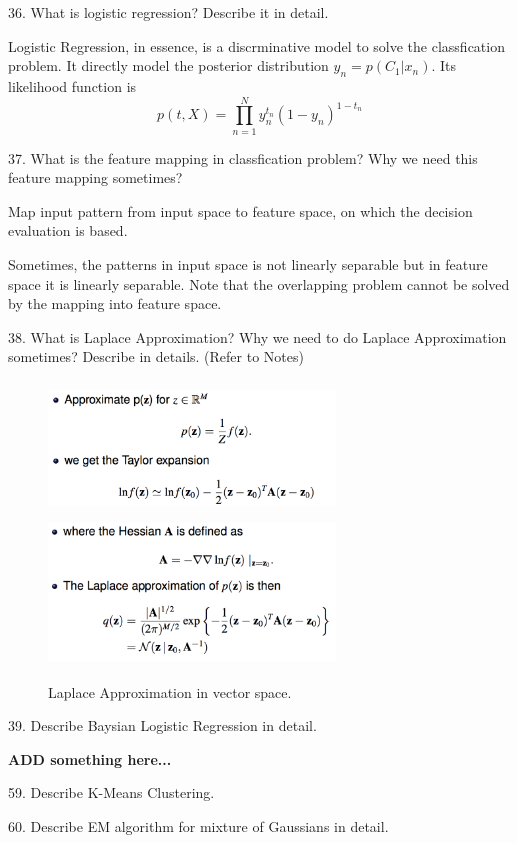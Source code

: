 \documentclass[11pt,a4paper]{article}
\newcommand{\BOLD}[1]{\textbf{#1}}
\begin{document}
36. What is logistic regression? Describe it in detail.

    Logistic Regression, in essence, is a discrminative model to solve the classfication problem. It directly model the posterior distribution $y_n = p(C_1 | x_n)$. Its likelihood function is 
    $$ p(t,X) = \prod_{n=1}^{N} y_{n}^{t_n} (1 - y_n) ^{1 - t_n} $$


37. What is the feature mapping in classfication problem? Why we need this feature mapping sometimes?

    Map input pattern from input space to feature space, on which the decision evaluation is based. 

    Sometimes, the patterns in input space is not linearly separable but in feature space it is linearly separable. Note that the overlapping problem cannot be solved by the mapping into feature space.

    38. What is Laplace Approximation? Why we need to do Laplace Approximation sometimes? Describe in details. (Refer to Notes)
{
    \begin{figure}[H] \centering
    \includegraphics[width=3in,height=1.4in]{./figure/Laplace_1.png}
    \includegraphics[width=3in,height=1.5in]{./figure/Laplace_2.png}
    \caption{Laplace Approximation in vector space.}
\end{figure}
}

39. Describe Baysian Logistic Regression in detail.

    \BOLD{ADD something here...}

    \newpage

59. Describe K-Means Clustering.

60. Describe EM algorithm for mixture of Gaussians in detail.
\end{document}
